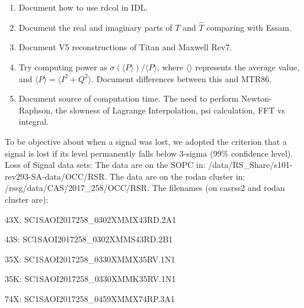 \documentclass[crop=false,class=article,oneside]{standalone}
\begin{document}
\begin{enumerate}
\begin{itemize}
            \end{itemize}
            \item Document how to use rdcol in IDL.
            \item Document the real and imaginary parts of $T$ and $\hat{T}$
                  comparing with Essam.
            \item Document V5 reconstructions of Titan and Maxwell Rev7.
            \item Try computing power as
                  $\sigma(\langle{P}\rangle)/\langle{P}\rangle$,
                  where $\langle\rangle$ represents the average value,
                  and $\langle{P}\rangle=\langle{I^{2}+Q^{2}}\rangle$.
                  Document differences between this and MTR86.
            \item Document source of computation time. The need
                  to perform Newton-Raphson, the slowness of
                  Lagrange Interpolation, psi calculation, FFT vs integral.
            
        \end{enumerate}
To be objective about when a signal was lost, we adopted the criterion that a signal is lost if its level permanently falls below 3-sigma (99\% confidence level).
Loss of Signal data sets:
The data are on the SOPC in:
/data/RS\_Share/s101-rev293-SA-data/OCC/RSR. The data are on the rodan cluster in: /rssg/data/CAS/2017\_258/OCC/RSR. The filenames (on casrss2 and rodan cluster are):
\begin{itemize}
\begin{multicols}{2}
    \item 43X: SC1SAOI2017258\_0302XMMX43RD.2A1
    \item 43S: SC1SAOI2017258\_0302XMMS43RD.2B1
    \item 35X: SC1SAOI2017258\_0330XMMX35RV.1N1
    \item 35K: SC1SAOI2017258\_0330XMMK35RV.1N1
    \item 74X: SC1SAOI2017258\_0459XMMX74RP.3A1
\end{multicols}
\end{itemize}
\end{document}
